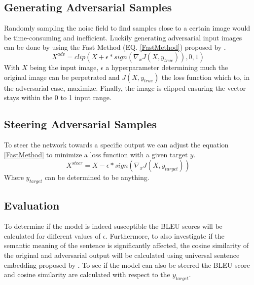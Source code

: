

\subsection*{Generating Adversarial Samples}
Randomly sampling the noise field to find samples close to a certain image would be time-consuming and inefficient. Luckily generating adversarial input images can be done by using the Fast Method (EQ. \ref{FastMethod}) proposed by \citeauthor{goodfellow2015explaining}.
\begin{equation}
    X^{adv} = clip(X + \epsilon * sign(\nabla_{x}J(X, y_{true})), 0, 1)
    \label{FastMethod}
\end{equation}
With $X$ being the input image, $\epsilon$ a hyperparameter determining much the original image can be perpetrated and $J(X, y_{true})$ the loss function which to, in the adversarial case, maximize. Finally, the image is clipped ensuring the vector stays within the 0 to 1 input range.

\subsection*{Steering Adversarial Samples}
To steer the network towards a specific output we can adjust the equation \ref{FastMethod} to minimize a loss function with a given target $y$.
\begin{equation}
    X^{steer} = X - \epsilon * sign(\nabla_{x}J(X, y_{target}))
\end{equation}
Where $y_{target}$ can be determined to be anything.

\subsection*{Evaluation}
To determine if the model is indeed susceptible the BLEU scores will be calculated for different values of $\epsilon$. Furthermore, to also investigate if the semantic meaning of the sentence is significantly affected, the cosine similarity of the original and adversarial output will be calculated using universal sentence embedding proposed by \citeauthor{DBLP:journals/corr/abs-1803-11175}.
To see if the model can also be steered the BLEU score and cosine similarity are calculated with respect to the $y_{target}$.

